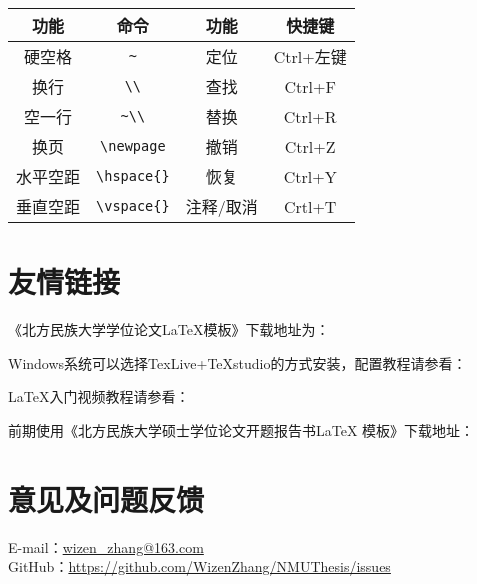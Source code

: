 \begin{center}
	\begin{tabular}{cc|cc}
		\toprule
		功能  & 命令 & 功能 & 快捷键   \\
		\midrule
		硬空格 & \verb|~| & 定位 & Ctrl+左键 \\
		换行 & \verb|\\| & 查找 & Ctrl+F \\
		空一行 & \verb|~\\| & 替换 & Ctrl+R \\
		换页 & \verb|\newpage| & 撤销 & Ctrl+Z \\
		水平空距 & \verb|\hspace{}| & 恢复 & Ctrl+Y \\
		垂直空距 & \verb|\vspace{}| & 注释/取消 & Crtl+T \\
		\bottomrule
	\end{tabular}
\end{center}

\section{友情链接}
\label{friendly_link}
\noindent《北方民族大学学位论文\LaTeX{}模板》下载地址为：


\noindent Windows系统可以选择TexLive+TeXstudio的方式安装，配置教程请参看：



\noindent \LaTeX{}入门视频教程请参看：


\noindent 前期使用《北方民族大学硕士学位论文开题报告书\LaTeX{} 模板》下载地址：


\section{意见及问题反馈}

\indent E-mail：\href{mailto:wizen_zhang@163.com}{wizen\_zhang@163.com}\\
\indent GitHub：\href{https://github.com/WizenZhang/NMUThesis/issues}{https://github.com/WizenZhang/NMUThesis/issues}


